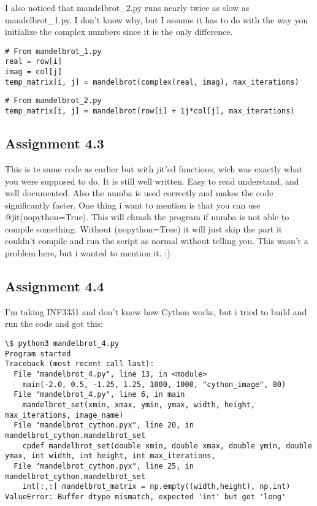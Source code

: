 \documentclass[a4paper]{article}
\begin{document}
I also noticed that mandelbrot\_2.py runs nearly twice as slow as mandelbrot\_1.py. I don't know why, but I assume it has to do with the way you initialize the complex numbers since it is the only difference.

\begin{verbatim}
# From mandelbrot_1.py
real = row[i]
imag = col[j]
temp_matrix[i, j] = mandelbrot(complex(real, imag), max_iterations)
\end{verbatim}

\begin{verbatim}
# From mandelbrot_2.py
temp_matrix[i, j] = mandelbrot(row[i] + 1j*col[j], max_iterations)
\end{verbatim}

\subsection*{Assignment 4.3}
This is te same code as earlier but with jit'ed functions, wich was exactly what you were supposed to do. It is still well written. Easy to read understand, and well documented. Also the numba is used correctly and makes the code significantly faster. One thing i want to mention is that you can use @jit(nopython=True). This will chrash the program if numba is not able to compile something. Without (nopython=True) it will just skip the part it couldn't compile and run the script as normal without telling you. This wasn't a problem here, but i wanted to mention it. :)

\subsection*{Assignment 4.4}
I'm taking INF3331 and don't know how Cython works, but i tried to build and run the code and got this:

\begin{verbatim}
\$ python3 mandelbrot_4.py
Program started
Traceback (most recent call last):
  File "mandelbrot_4.py", line 13, in <module>
    main(-2.0, 0.5, -1.25, 1.25, 1000, 1000, "cython_image", 80)
  File "mandelbrot_4.py", line 6, in main
    mandelbrot_set(xmin, xmax, ymin, ymax, width, height, max_iterations, image_name)
  File "mandelbrot_cython.pyx", line 20, in mandelbrot_cython.mandelbrot_set
    cpdef mandelbrot_set(double xmin, double xmax, double ymin, double ymax, int width, int height, int max_iterations,
  File "mandelbrot_cython.pyx", line 25, in mandelbrot_cython.mandelbrot_set
    int[:,:] mandelbrot_matrix = np.empty((width,height), np.int)
ValueError: Buffer dtype mismatch, expected 'int' but got 'long'
\end{verbatim}
\end{document}
